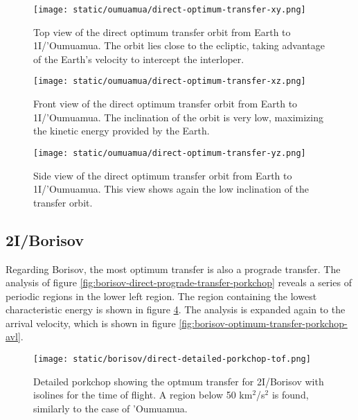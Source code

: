 \begin{figure}[H]
  \centering
  \texttt{[image: static/oumuamua/direct-optimum-transfer-xy.png]}
  \caption[Top view of the direct optimum transfer orbit from Earth to 1I/'Oumuamua]{
    Top view of the direct optimum transfer orbit from Earth to 1I/'Oumuamua.
    The orbit lies close to the ecliptic, taking advantage of the Earth's
    velocity to intercept the interloper.
  }
  \label{fig:optimum_oumuamua_orbit_xy}
\end{figure}

\begin{figure}[H]
  \centering
  \texttt{[image: static/oumuamua/direct-optimum-transfer-xz.png]}
  \caption[Front view of the direct optimum transfer orbit from Earth to 1I/'Oumuamua]{
    Front view of the direct optimum transfer orbit from Earth to 1I/'Oumuamua.
    The inclination of the orbit is very low, maximizing the kinetic energy
    provided by the Earth.
  }
  \label{fig:optimum_oumuamua_orbit_yz}
\end{figure}

\begin{figure}[H]
  \centering
  \texttt{[image: static/oumuamua/direct-optimum-transfer-yz.png]}
  \caption[Side view of the direct optimum transfer orbit from Earth to 1I/'Oumuamua]{
    Side view of the direct optimum transfer orbit from Earth to 1I/'Oumuamua.
    This view shows again the low inclination of the transfer orbit.}
  \label{fig:optimum_oumuamua_orbit_xz}
\end{figure}

\subsection{2I/Borisov}

Regarding Borisov, the most optimum transfer is also a prograde transfer. The
analysis of figure \ref{fig:borisov-direct-prograde-transfer-porkchop} reveals a
series of periodic regions in the lower left region. The region containing the
lowest characteristic energy is shown in figure
\ref{fig:borisov-optimum-transfer-porkchop-tof}. The analysis is expanded again
to the arrival velocity, which is shown in figure
\ref{fig:borisov-optimum-transfer-porkchop-avl}.

\begin{figure}[H]
  \centering
  \texttt{[image: static/borisov/direct-detailed-porkchop-tof.png]}
  \caption[Detailed porkchop showing the optimum transfer for
    2I/Borisov with the time of flight.]{Detailed porkchop showing the
    optmum transfer for 2I/Borisov with isolines for the time of flight. A
    region below 50 km$^2$/s$^2$ is found, similarly to the case of
    'Oumuamua.}
  \label{fig:borisov-optimum-transfer-porkchop-tof}
\end{figure}

